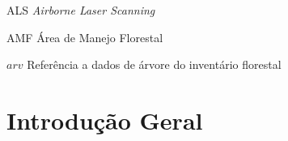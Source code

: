 \documentclass[
	12pt,				%
	openright,			%
	twoside,			%
	a4paper,			%
	chapter=TITLE,		%
	sumario=abnt-6027-2012,
	english,			%
	brazil				%
	]{UFVJM-abntex2}
\newcommand{\li}{\textit{LiDAR }}
\begin{document}
\listoffigures*
\cleardoublepage

\listoftables*
\cleardoublepage

\begin{siglas}
\label{Siglas}
\item[ALS] \textit{Airborne Laser Scanning}
\item[AMF] Área de Manejo Florestal 
\item[$arv$] Referência a dados de árvore do inventário florestal

\end{siglas}



\tableofcontents
\cleardoublepage



\textual

\chapter*[Introdução Geral]{Introdução Geral}





%
\end{document}

